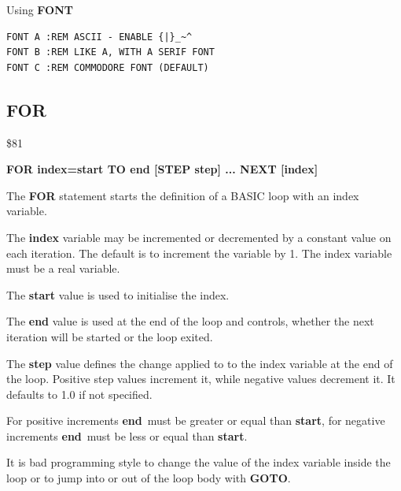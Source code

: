 \begin{description}[leftmargin=2cm,style=nextline]
\item [Example:] Using {\bf FONT}
\begin{tcolorbox}[colback=black,coltext=white]
\begin{verbatim}
FONT A :REM ASCII - ENABLE {|}_~^
FONT B :REM LIKE A, WITH A SERIF FONT
FONT C :REM COMMODORE FONT (DEFAULT)
\end{verbatim}
\end{tcolorbox}
\end{description}


\newpage
\subsection{FOR}
\begin{description}[leftmargin=2cm,style=nextline]
\item [Token:] \$81
\item [Format:] {\bf FOR index=start TO end [STEP step] ... NEXT [index]}
\item [Usage:] The {\bf FOR} statement starts the definition
               of a BASIC loop with an index variable.

               The {\bf index} variable may be incremented or decremented
               by a constant value on each iteration. The default
               is to increment the variable by 1.
               The index variable must be a real variable.

               The {\bf start} value is used to initialise the index.

               The {\bf end} value is used at the end of the loop
               and controls, whether the next iteration will be started
               or the loop exited.

               The {\bf step} value defines the change applied to
               to the index variable at the end of the loop.
               Positive step values increment it, while negative values
               decrement it. It defaults to 1.0 if not specified.

\item [Remarks:] For positive increments {\bf end} must be greater
               or equal than {\bf start}, for negative increments
               {\bf end} must be less or equal than {\bf start}.

               It is bad programming style to change the value
               of the index variable inside the loop or to
               jump into or out of the loop body with {\bf GOTO}.


\end{description}
